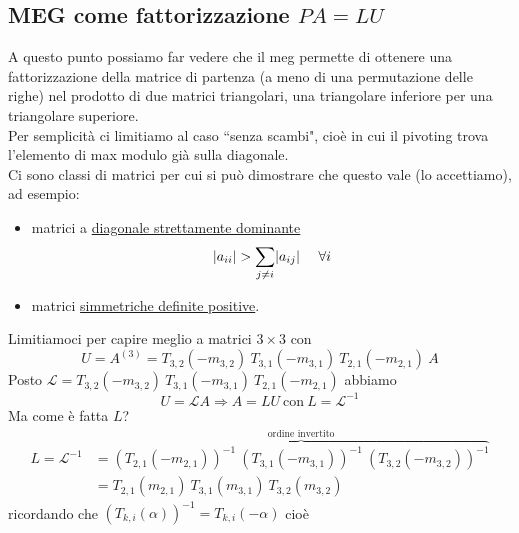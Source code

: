 \documentclass[12pt,a4paper]{article}
\DeclarePairedDelimiter{\abs}{\lvert}{\rvert}
\begin{document}
\subsection{MEG come fattorizzazione $PA=LU$}
A questo punto possiamo far vedere che il meg permette di ottenere una fattorizzazione della matrice di partenza (a meno di una permutazione delle righe) nel prodotto di due matrici triangolari, una triangolare inferiore per una triangolare superiore.\\
Per semplicità ci limitiamo al caso ``senza scambi", cioè in cui il pivoting trova l'elemento di max modulo già sulla diagonale.\\
Ci sono classi di matrici per cui si può dimostrare che questo vale (lo accettiamo), ad esempio:
\begin{itemize}
    \item matrici a \uline{diagonale strettamente dominante}
    \[
        \abs{a_{ii}} > \sum_{j \neq i} \abs{a_{ij}} \  \  \  \ \forall i
    \]
    
    \item matrici \uline{simmetriche definite positive}. \end{itemize} Limitiamoci per capire meglio a matrici $3 \times 3$ con
    \[
    U = A^{(3)} = T_{3,2} (-m_{3,2}) \ T_{3,1} (-m_{3,1}) \ T_{2,1} (-m_{2,1}) \ A
    \]
    Posto $\mathcal{L} = T_{3,2} (-m_{3,2}) \ T_{3,1} (-m_{3,1}) \ T_{2,1} (-m_{2,1})$ abbiamo
    \[
    U = \mathcal{L}A \Rightarrow A = LU \ \text{con} \ L = \mathcal{L}^{-1}
    \]
    Ma come è fatta $L$?
    \[
    \begin{split}
        L = \mathcal{L}^{-1} & = \overbrace{(T_{2,1} (-m_{2,1}))^{-1} \ (T_{3,1} (-m_{3,1}))^{-1} \ (T_{3,2} (-m_{3,2}))^{-1}}^{\text{ordine invertito}} \\
        & = T_{2,1} (m_{2,1}) \ T_{3,1} (m_{3,1}) \ T_{3,2} (m_{3,2})
    \end{split}
    \]
    ricordando che $(T_{k,i} (\alpha))^{-1} = T_{k, i} (-\alpha)$ cioè
\end{document}
